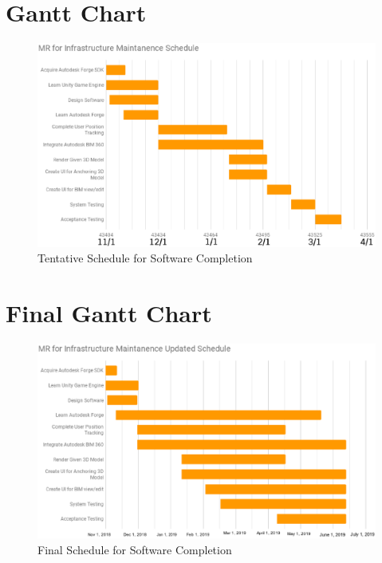\documentclass[onecolumn, draftclsnofoot,10pt, compsoc]{IEEEtran}
\begin{document}
\pagebreak
\section{Gantt Chart}
    \begin{figure}[ht]
        \centering
            \includegraphics[width=1.0\textwidth]{schedule.eps}
        \caption{Tentative Schedule for Software Completion}
    \end{figure}
    \clearpage
\section{Final Gantt Chart}
    \begin{figure}[ht]
        \centering
            \includegraphics[width=1.0\textwidth]{team20_updated_schedule.eps}
        \caption{Final Schedule for Software Completion}
    \end{figure}
\end{document}
